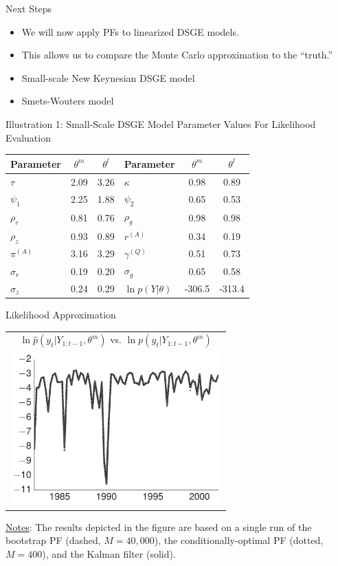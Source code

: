 \documentclass[presentation]{beamer}
\newcommand{\spitem}{\vspace{.3cm}\item}
\begin{document}
\begin{frame}[label={sec:org332a46c}]{Next Steps}
\begin{itemize}
	\spitem We will now apply PFs to linearized DSGE models.
	\spitem This allows us to compare the Monte Carlo approximation to the ``truth.''
	\spitem Small-scale New Keynesian DSGE model
	\spitem Smets-Wouters model
\end{itemize}
\end{frame}

\begin{frame}[label={sec:orgcb8ee8f}]{Illustration 1: Small-Scale DSGE Model}
Parameter Values For Likelihood Evaluation
\begin{center}
	\begin{tabular}{lcclcc} \hline\hline
		Parameter & $\theta^{m}$ & $\theta^{l}$ & Parameter & $\theta^{m}$ & $\theta^{l}$  \\ \hline
		$\tau$               &  2.09 &  3.26 & $\kappa$             &  0.98 &  0.89 \\
		$\psi_1$             &  2.25 &  1.88 & $\psi_2$             &  0.65 &  0.53 \\
		$\rho_r$             &  0.81 &  0.76 & $\rho_g$             &  0.98 &  0.98 \\
		$\rho_z$             &  0.93 &  0.89 & $r^{(A)}$            &  0.34 &  0.19 \\
		$\pi^{(A)}$          &  3.16 &  3.29 & $\gamma^{(Q)}$       &  0.51 &  0.73 \\
		$\sigma_r$           &  0.19 &  0.20 & $\sigma_g$           &  0.65 &  0.58 \\
		$\sigma_z$           &  0.24 &  0.29 & $\ln p(Y|\theta)$    & -306.5 & -313.4 \\ \hline
	\end{tabular}
\end{center}
\end{frame}

\begin{frame}[label={sec:org4f2ef93}]{Likelihood Approximation}
\begin{center}
	\begin{tabular}{c}
		$\ln \hat{p}(y_t|Y_{1:t-1},\theta^m)$ vs. $\ln p(y_t|Y_{1:t-1},\theta^m)$ \\
		\includegraphics[width=3.2in]{dsge1_me_paramax_lnpy.pdf} 
	\end{tabular}
\end{center}
\uline{Notes}: The results depicted in the figure are based on a single run
of the bootstrap PF (dashed, \(M=40,000\)), the conditionally-optimal PF (dotted, \(M=400\)), and the Kalman filter (solid).
\end{frame}
\end{document}
